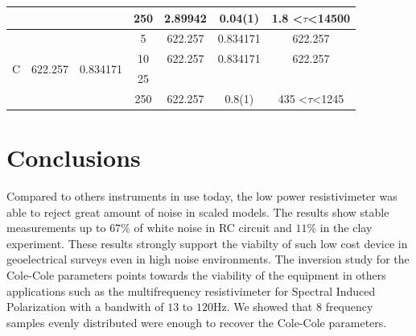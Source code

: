 \documentclass{vie16}
\begin{document}
\begin{table}[h!]
\begin{tabular}{@{}|c|c|c|c|c|c|c|@{}}
                   &                          &                            & 250                                                                            & 2.89942         & 0.04(1)           & 1.8 \textless$\tau$\textless 14500  \\ \hline
\multirow{4}{*}{C} & \multirow{4}{*}{622.257} & \multirow{4}{*}{0.834171}  & 5                                                                              & 622.257         & 0.834171          & 622.257                             \\
                   &                          &                            & 10                                                                             & 622.257         & 0.834171          & 622.257                             \\
                   &                          &                            & 25                                                                             &                 &                   &                                     \\
                   &                          &                            & 250                                                                            & 622.257         & 0.8(1)            & 435 \textless $\tau $\textless 1245
\end{tabular}
\end{table}



\section{Conclusions}

Compared to others instruments in use today, the low power
resistivimeter was able to reject great amount of noise in scaled
models. The results show stable measurements up to $67\%$ of white
noise in RC circuit and $11 \%$ in the clay experiment. These results
strongly support the viabilty of such low cost device in geoelectrical
surveys even in high noise environments. The inversion study for the
Cole-Cole parameters points towards the viability of the equipment in
others applications such as the multifrequency resistivimeter for
Spectral Induced Polarization with a bandwith of $13$ to $120$Hz. We
showed that $8$ frequency samples evenly distributed were enough to
recover the Cole-Cole parameters.



		
\end{document}

